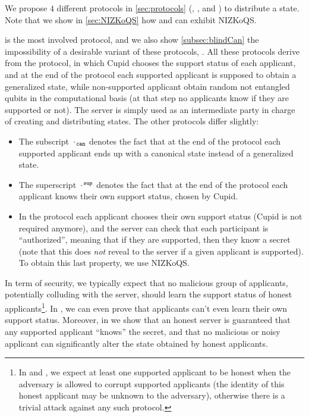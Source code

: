 We propose $4$ different protocols in \cref{sec:protocols} (\blind{}, \blindSup{}, \blindCanSup{} and \authBlindCanDist{}) to distribute a \GHZ{} state. Note that we show in \cref{sec:NIZKoQS} how \blind{} and \authBlindCanDist{} can exhibit NIZKoQS.

\authBlindCanDist{} is the most involved protocol, and we also show \cref{subsec:blindCan} the impossibility of a desirable variant of these protocols, \blindCan{}. All these protocols derive from the \blind{} protocol, in which Cupid chooses the support status of each applicant, and at the end of the protocol each supported applicant is supposed to obtain a generalized \GHZ{} state, while non-supported applicant obtain random not entangled qubits in the computational basis (at that step no applicants know if they are supported or not). The server is simply used as an intermediate party in charge of creating and distributing states. The other protocols differ slightly:
\begin{itemize}
  \item The subscript ${\mkern 2mu\cdot\mkern 2mu}_{\tt can}$ denotes the fact that at the end of the protocol each supported applicant ends up with a canonical \GHZ{} state instead of a generalized \GHZ{} state.
  \item The superscript ${\mkern 2mu\cdot\mkern 2mu}^{\tt sup}$ denotes the fact that at the end of the protocol each applicant knows their own support status, chosen by Cupid.
  \item In the protocol \authBlindCanDist{} each applicant chooses their own support status (Cupid is not required anymore), and the server can check that each participant is ``authorized'', meaning that if they are supported, then they know a secret (note that this does \emph{not} reveal to the server if a given applicant is supported). To obtain this last property, we use NIZKoQS.
\end{itemize}
In term of security, we typically expect that no malicious group of applicants, potentially colluding with the server, should learn the support status of honest applicants\footnote{In \blindCanSup{} and \authBlindCanDist{}, we expect at least one supported applicant to be honest when the adversary is allowed to corrupt supported applicants (the identity of this honest applicant may be unknown to the adversary), otherwise there is a trivial attack against any such protocol.}. In \blind{}, we can even prove that applicants can't even learn their own support status. Moreover, in \authBlindCanDist{} we show that an honest server is guaranteed that any supported applicant ``knows'' the secret, and that no malicious or noisy applicant can significantly alter the state obtained by honest applicants.


